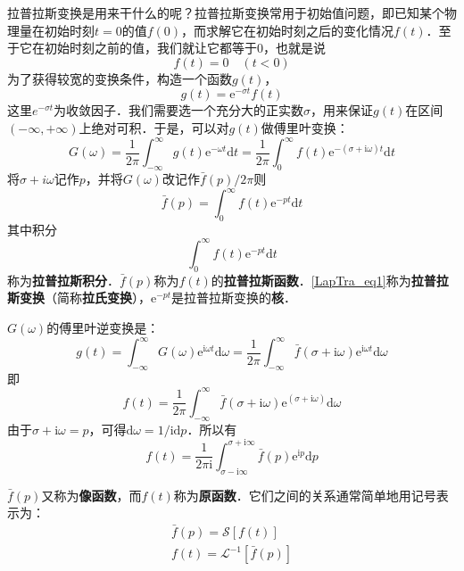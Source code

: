 
拉普拉斯变换是用来干什么的呢？拉普拉斯变换常用于初始值问题，即已知某个物理量在初始时刻$t=0$的值$f(0)$，而求解它在初始时刻之后的变化情况$f(t)$．至于它在初始时刻之前的值，我们就让它都等于$0$，也就是说
\begin{equation}
f(t)=0 \quad(t<0)
\end{equation}
为了获得较宽的变换条件，构造一个函数$g(t)$，
\begin{equation}
g(t)=\mathrm{e}^{-\sigma t} f(t)
\end{equation}
这里$e^{-\sigma t}$为收敛因子．我们需要选一个充分大的正实数$\sigma$，用来保证$g(t) $在区间$(-\infty,+\infty)$上绝对可积．于是，可以对$g(t) $做傅里叶变换：
\begin{equation}
G(\omega)=\frac{1}{2 \pi} \int_{-\infty}^{\infty} g(t) \mathrm{e}^{-\omega t} \mathrm{d} t=\frac{1}{2 \pi} \int_{0}^{\infty} f(t) \mathrm{e}^{-(\sigma+\mathrm{i} \omega) t} \mathrm{d} t
\end{equation}
将$\sigma+i \omega$记作$p$，并将$G(\omega)$改记作$\bar f(p) / 2 \pi$则
\begin{equation} \label{LapTra_eq1}
\bar{f}(p)=\int_{0}^{\infty} f(t) \mathrm{e}^{-p t} \mathrm{d} t
\end{equation}
其中积分
\begin{equation}
\int_{0}^{\infty} f(t) \mathrm{e}^{-p t} \mathrm{d} t
\end{equation}
称为\textbf{拉普拉斯积分}．$\bar f(p)$称为$f(t)$的\textbf{拉普拉斯函数}．\autoref{LapTra_eq1}称为\textbf{拉普拉斯变换}（简称\textbf{拉氏变换}），$\mathrm e^{-pt}$是拉普拉斯变换的\textbf{核}．

$G(\omega)$的傅里叶逆变换是：
\begin{equation}
g(t)=\int_{-\infty}^{\infty} G(\omega) \mathrm{e}^{\mathrm{i} \omega t} \mathrm{d} \omega=\frac{1}{2 \pi} \int_{-\infty}^{\infty} \bar{f}(\sigma+\mathrm{i} \omega) \mathrm{e}^{\mathrm{i} \omega t} \mathrm{d} \omega
\end{equation}
即
\begin{equation}
f(t)=\frac{1}{2 \pi} \int_{-\infty}^{\infty} \bar{f}(\sigma+\mathrm{i} \omega) \mathrm{e}^{(\sigma+\mathrm{i} \omega)} \mathrm{d} \omega
\end{equation}
由于$\sigma+\mathrm i\omega=p$，可得$\mathrm d\omega = 1/\mathrm i\mathrm dp$．所以有
\begin{equation}
f(t)=\frac{1}{2 \pi \mathrm{i}} \int_{\sigma-\mathrm{i} \infty}^{\sigma+\mathrm{i} \infty} \bar{f}(p) \mathrm{e}^{\mathrm{i} p} \mathrm{d} p
\end{equation}

$\bar f(p)$又称为\textbf{像函数}，而$f(t)$称为\textbf{原函数}．它们之间的关系通常简单地用记号表示为：
\begin{equation}
\begin{array}{l}\bar{f}(p)=\mathscr{S}[f(t)] \\ f(t)=\mathscr{L}^{-1}[\bar{f}(p)]\end{array}
\end{equation}
